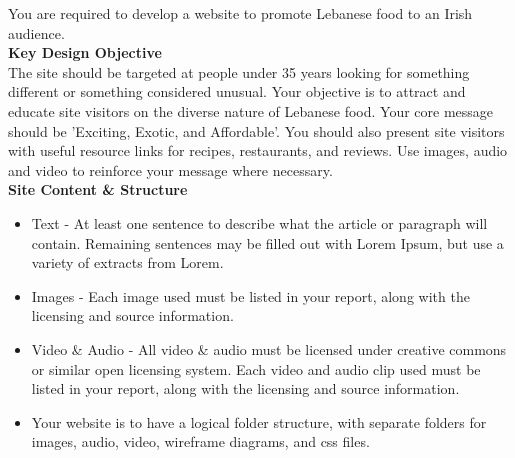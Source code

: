 You are required to develop a website to promote Lebanese food to an Irish audience.\\  

\textbf{Key Design Objective}\\




The site should be targeted at people under 35 years looking for something different or something considered unusual.  Your objective is to attract and educate site visitors on the diverse nature of Lebanese food.  Your core message should be 'Exciting, Exotic, and Affordable'.  You should also present site visitors with useful resource links for recipes, restaurants, and reviews. Use images, audio and video to reinforce your message where necessary.\\

\textbf{Site Content \& Structure}

\begin{itemize}
	\item Text - At least one sentence to describe what the article or paragraph will contain.  Remaining sentences may be filled out with Lorem Ipsum, but use a variety of extracts from Lorem.
	\item Images - Each image used must be listed in your report, along with the licensing and source information.   
	\item Video \& Audio - All video \& audio must be licensed under creative commons or similar open licensing system.  Each video and audio clip used must be listed in your report, along with the licensing and source information.
	\item Your website is to have a logical folder structure, with separate folders for images, audio, video, wireframe diagrams, and css files. 
\end{itemize}


